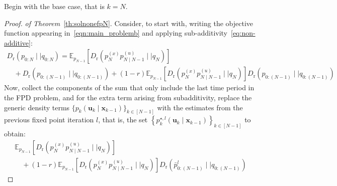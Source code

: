 \documentclass[a4paper,fleqn]{cas-sc}
\newcommand{\E}{\mathbb{E}}
\newcommand{\bv}[1]{\mathbf{#1}}
\newcommand{\Dr}[2]{{D}_{\text{r}}\left(#1\mid \mid #2 \right)}
\newcommand{\shortplant}[1]{p_{{#1}}^{(x)}}
\newcommand{\policy}[2]{p_{{#1}}\left(\bv{u}_{{#1}}\mid \bv{x}_{{#2}} \right)}
\newcommand{\shortpolicy}[2]{p_{{#1}\mid{#2}}^{(u)}}
\newcommand{\optimalpolicygen}[3]{p^{\star,{#3}}_{{#1}} \left(\bv{u}_{{#1}}\mid \bv{x}_{{#2}} \right)}
\begin{document}
Begin with the base case, that is $k=N$.
\begin{proof} \emph{of Theorem}~\ref{th:solnonefpN}.
Consider, to start with, writing the objective function appearing in~\eqref{eqn:main_problemb} and applying sub-additivity~\eqref{eq:non-additive}:
\begin{equation}\label{eq:sumndecompose}
\begin{array}{l}
\Dr{p_{0:N}}{q_{0:N}} = \E_{p_{N-1}}\left[\Dr{\shortplant{N}\shortpolicy{N}{N-1}}{q_N}\right]
\\ \quad +\Dr{p_{0:(N-1)}}{q_{0:(N-1)}}+(1-r)\E_{p_{N-1}}\left[\Dr{\shortplant{N}\shortpolicy{N}{N-1}}{q_N}\right]\Dr{p_{0:(N-1)}}{q_{0:(N-1)}} 
\end{array}
\end{equation}
Now, collect the components of the sum that only include the last time period in the FPD problem, and for the extra term arising from subadditivity, replace the generic density terms $\{\policy{k}{k-1}\}_{k\in[N-1]}$ with the estimates from the previous fixed point iteration $l$, that is, 
the set $\left\{\optimalpolicygen{k}{k-1}{l}\right\}_{k\in[N-1]}$ to obtain:
\[
\begin{array}{l}
\E_{p_{N-1}}\left[\Dr{\shortplant{N}\shortpolicy{N}{N-1}}{q_N}\right]
\\ \quad +(1-r)\E_{p_{N-1}}\left[\Dr{\shortplant{N}\shortpolicy{N}{N-1}}{q_N}\right]\Dr{\bar{p}^{l}_{0:(N-1)}}{q_{0:(N-1)}} 
\end{array}
\]



\end{proof}
\end{document}
